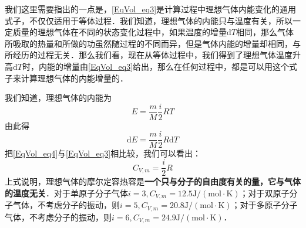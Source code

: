 我们这里需要指出的一点是，\autoref{EqVol_eq3}是计算过程中理想气体内能变化的通用式子，不仅仅适用于等体过程．我们知道，理想气体的内能只与温度有关，所以一定质量的理想气体在不同的状态变化过程中，如果温度的增量$\mathrm dT $相同，那么气体所吸取的热量和所做的功虽然随过程的不同而异，但是气体内能的增量却相同，与所经历的过程无关．那么我们看，现在从等体过程中，我们得到了理想气体温度升高$\mathrm dT $时，内能的增量由\autoref{EqVol_eq3}给出，那么在任何过程中，都是可以用这个式子来计算理想气体的内能增量的．

我们知道，理想气体的内能为
\begin{equation}
E=\frac{m}{M} \frac{i}{2} R T
\end{equation}
由此得
\begin{equation} \label{EqVol_eq4}
\mathrm{d} E=\frac{m}{M} \frac{i}{2} R \mathrm{d} T
\end{equation}
把\autoref{EqVol_eq4}与\autoref{EqVol_eq3}相比较，我们可以看出：
\begin{equation}
C_{V, m}=\frac{i}{2} R
\end{equation}
上式说明，理想气体的摩尔定容热容是\textbf{一个只与分子的自由度有关的量，它与气体的温度无关}．对于单原子分子气体$i=3, C_{V, m}=12.5 \mathrm{J} /(\mathrm{mol} \cdot \mathrm{K})$；对于双原子分子气体，不考虑分子的振动，则$i=5, C_{V, {m}}=20.8 \mathrm{J} /(\mathrm{mol} \cdot \mathrm{K})$；对于多原子分子气体，不考虑分子的振动，则$i=6, C_{V, {m}}=24.9 \mathrm{J} /(\mathrm{mol} \cdot \mathrm{K})$．
